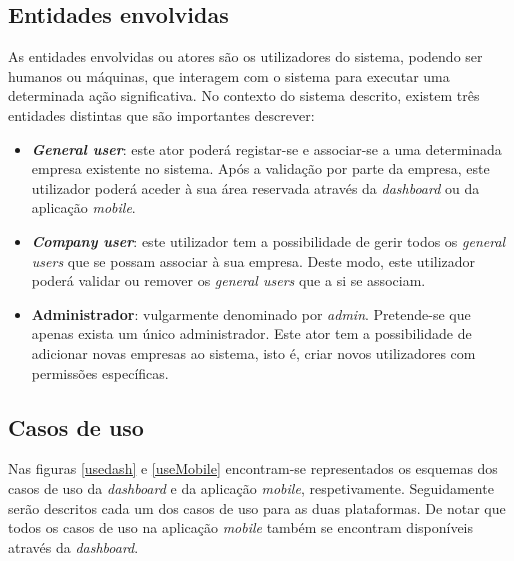 \subsection{Entidades envolvidas}

As entidades envolvidas ou atores são os utilizadores do sistema, podendo ser humanos ou máquinas, que interagem com o sistema para executar uma determinada ação significativa. No contexto do sistema descrito, existem três entidades distintas que são importantes descrever: 

\begin{itemize}
	
	\item \textbf{\textit{General user}}: este ator poderá registar-se e associar-se a uma determinada empresa existente no sistema. Após a validação por parte da empresa, este utilizador poderá aceder à sua área reservada através da \textit{dashboard} ou da aplicação \textit{mobile}. 
	
	\item \textbf{\textit{Company user}}: este utilizador tem a possibilidade de gerir todos os \textit{general users} que se possam associar à sua empresa. Deste modo, este utilizador poderá validar ou remover os \textit{general users} que a si se associam. 
	
	\item \textbf{Administrador}: vulgarmente denominado por \textit{admin}. Pretende-se que apenas exista um único administrador. Este ator tem a possibilidade de adicionar novas empresas ao sistema, isto é, criar novos utilizadores com permissões específicas. 
	
\end{itemize}

\subsection{Casos de uso}

Nas figuras \ref{usedash} e \ref{useMobile} encontram-se representados os esquemas dos casos de uso da \textit{dashboard} e da aplicação \textit{mobile}, respetivamente.
Seguidamente serão descritos cada um dos casos de uso para as duas plataformas. De notar que todos os casos de uso na aplicação \textit{mobile} também se encontram disponíveis através da \textit{dashboard}. 

